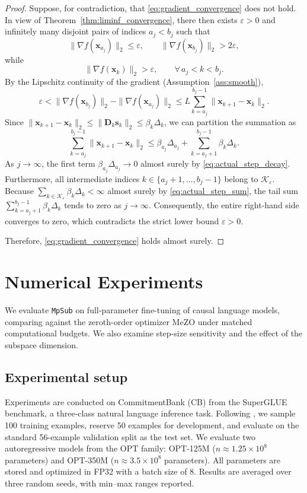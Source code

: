\documentclass{siamart171218}
\newcommand{\bx}{\bm{x}}
\newcommand{\bs}{\bm{s}}
\begin{document}
\begin{proof}
Suppose, for contradiction, that \eqref{eq:gradient_convergence} does not hold. In view of Theorem~\ref{thm:liminf_convergence}, there then exists $\varepsilon>0$ and infinitely many disjoint pairs of indices $a_j < b_j$ such that
\[
\|\nabla f(\bx_{a_j})\|_2 \le \varepsilon, \qquad \|\nabla f(\bx_{b_j})\|_2 > 2\varepsilon,
\]
while
\[
\|\nabla f(\bx_k)\|_2 > \varepsilon, \qquad \forall\, a_j < k < b_j.
\]
By the Lipschitz continuity of the gradient (Assumption~\ref{ass:smooth}),
\[
\varepsilon < \|\nabla f(\bx_{b_j})\|_2 - \|\nabla f(\bx_{a_j})\|_2 \le L \sum_{k=a_j}^{b_j-1} \|\bx_{k+1}-\bx_k\|_2.
\]
Since $\|\bx_{k+1}-\bx_k\|_2 \le \|\bm D_k \bs_k\|_2 \le \beta_k\Delta_k$, we can partition the summation as
\[
\sum_{k=a_j}^{b_j-1} \|\bx_{k+1}-\bx_k\|_2 \le \beta_{a_j}\Delta_{a_j} + \sum_{k=a_j+1}^{b_j-1} \beta_k\Delta_k.
\]
As $j\to\infty$, the first term $\beta_{a_j}\Delta_{a_j} \to 0$ almost surely by \eqref{eq:actual_step_decay}. Furthermore, all intermediate indices $k \in \{a_j+1, \ldots, b_j-1\}$ belong to $\mathcal K_\varepsilon$. Because $\sum_{k\in\mathcal K_\varepsilon} \beta_k\Delta_k < \infty$ almost surely by \eqref{eq:actual_step_sum}, the tail sum $\sum_{k=a_j+1}^{b_j-1} \beta_k\Delta_k$ tends to zero as $j\to\infty$. Consequently, the entire right-hand side converges to zero, which contradicts the strict lower bound $\varepsilon > 0$.

Therefore, \eqref{eq:gradient_convergence} holds almost surely.
\end{proof}

\section{Numerical Experiments}
\label{sec:experiments}

We evaluate \texttt{MpSub} on full-parameter fine-tuning of causal language models, comparing against the zeroth-order optimizer MeZO \cite{malladi2023mezo} under matched computational budgets. We also examine step-size sensitivity and the effect of the subspace dimension.

\subsection{Experimental setup}
\label{subsec:setup}

Experiments are conducted on CommitmentBank (CB) from the SuperGLUE benchmark, a three-class natural language inference task. Following \cite{malladi2023mezo}, we sample 100 training examples, reserve 50 examples for development, and evaluate on the standard 56-example validation split as the test set. We evaluate two autoregressive models from the OPT family: OPT-125M ($n \approx 1.25 \times 10^8$ parameters) and OPT-350M ($n \approx 3.5 \times 10^8$ parameters). All parameters are stored and optimized in FP32 with a batch size of 8. Results are averaged over three random seeds, with min--max ranges reported.
\end{document}
